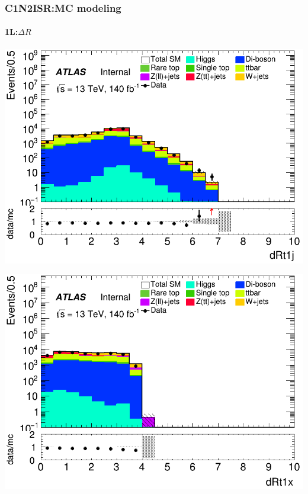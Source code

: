 \documentclass[usenames,dvipsnames]{beamer}
\begin{document}
\begin{frame}
\begin{minipage}{0.32\textwidth}
    \end{minipage}
\end{frame}

\begin{frame}
\frametitle{C1N2ISR:MC modeling}
\framesubtitle{1L:\quad $\Delta R$}
    \begin{minipage}{0.32\textwidth}
        \centering
        \includegraphics[width=\textwidth]{graphics/L_met/L_met_dRt1j.png}
    \end{minipage}
    \hfill
    \begin{minipage}{0.32\textwidth}
        \centering
        \includegraphics[width=\textwidth]{graphics/L_met/L_met_dRt1x.png}
    \end{minipage}
    \hfill
    \begin{minipage}{0.32\textwidth}

\end{minipage}
\end{frame}
\end{document}
